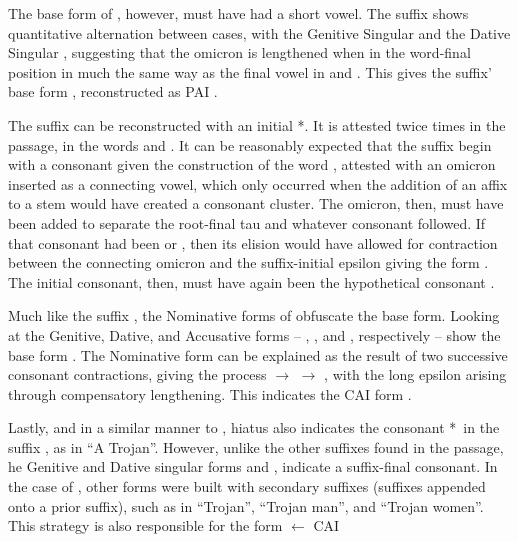 The base form of , however, must have had a short vowel.
The suffix shows quantitative alternation between cases, with the
Genitive Singular  and the Dative Singular ,
suggesting that the omicron  is lengthened when in the
word-final position in much the same way as the final vowel in
 and . This gives the suffix' base form
, reconstructed as PAI .



The suffix  can be reconstructed with an initial *\w.
It is attested twice times in the passage, in the words  and .
It can be reasonably expected that the suffix begin with a consonant
given the construction of the word , attested with
an omicron  inserted as a connecting vowel, which only
occurred when the addition of an affix to a stem would have created a
consonant cluster. The omicron, then, must have been added to separate
the root-final tau  and whatever consonant followed.
If that consonant had been  or , then its elision would have
allowed for contraction between the connecting omicron 
and the suffix-initial epsilon  giving the form
. The initial consonant, then, must have again been the
hypothetical consonant \w.

Much like the suffix , the Nominative forms of 
obfuscate the base form. Looking at the Genitive, Dative, and Accusative
forms -- , , and , respectively --
show the base form . The Nominative form can be explained
as the result of two successive consonant contractions, giving the
process  $\to$  $\to$ , with
the long epsilon 
arising through compensatory
lengthening. This indicates the CAI form .

Lastly, and in a similar manner to , hiatus also indicates the consonant *\w\ in the suffix , as in  ``A Trojan''. However, unlike the other suffixes found in the passage, he Genitive and Dative singular forms  and , indicate a suffix-final consonant. In the case of , other forms were built with secondary suffixes (suffixes appended onto a prior suffix), such as in  ``Trojan'',  ``Trojan man'', and  ``Trojan women''. This strategy is also responsible for the form  $\gets$ CAI 

